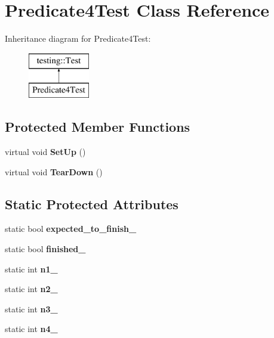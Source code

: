 \hypertarget{class_predicate4_test}{}\section{Predicate4\+Test Class Reference}
\label{class_predicate4_test}
Inheritance diagram for Predicate4\+Test\+:\begin{figure}[H]
\begin{center}
\leavevmode
\includegraphics[height=2.000000cm]{class_predicate4_test}
\end{center}
\end{figure}
\subsection*{Protected Member Functions}
\begin{DoxyCompactItemize}
\item 
\mbox{\label{class_predicate4_test_afcf9db5dc68e97291813cdfeb2aaa5d2}} 
virtual void {\bfseries Set\+Up} ()
\item 
\mbox{\label{class_predicate4_test_ab61983a4cdf3657b02bc2b81b67729c4}} 
virtual void {\bfseries Tear\+Down} ()
\end{DoxyCompactItemize}
\subsection*{Static Protected Attributes}
\begin{DoxyCompactItemize}
\item 
\mbox{\label{class_predicate4_test_a20600b5eda187c42ce4e812e77269654}} 
static bool {\bfseries expected\+\_\+to\+\_\+finish\+\_\+}
\item 
\mbox{\label{class_predicate4_test_acfd174bf9dfb5a91afbcdca17e797888}} 
static bool {\bfseries finished\+\_\+}
\item 
\mbox{\label{class_predicate4_test_a8eb30cd283e613f7a2e501a3969be9ae}} 
static int {\bfseries n1\+\_\+}
\item 
\mbox{\label{class_predicate4_test_a088fce743c747e3851c926cb3a87fda3}} 
static int {\bfseries n2\+\_\+}
\item 
\mbox{\label{class_predicate4_test_a00ae6ae54c7d6639d448c036aedb6114}} 
static int {\bfseries n3\+\_\+}
\item 
\mbox{\label{class_predicate4_test_ae42e23ce11e3f1c6b813496d6180cc67}} 
static int {\bfseries n4\+\_\+}
\end{DoxyCompactItemize}
